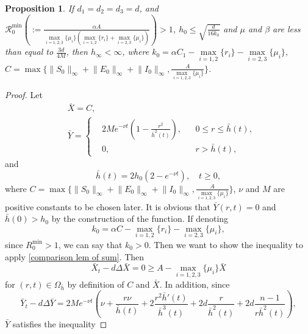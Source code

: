\documentclass[11pt]{amsart}
\numberwithin{equation}{section}
\theoremstyle{plain}
\newtheorem{proposition}[theorem]{Proposition}
\theoremstyle{definition}
\begin{document}
\begin{proposition}
	If $d_1=d_2=d_3=d$, and $\mathcal R_0^{\min}\left(:=\frac{\alpha A}{\max\limits_{i=1,2,3}\{\mu_i\}(\max\limits_{i=1,2}\{r_i\}+\max\limits_{i=2,3}\{\mu_i\})}\right)>1$, $h_0\leq \sqrt{\frac{d}{16k_0}}$ and $\mu$ and $\beta$ are less than equal to $\frac{3d}{4M}$, then $h_\infty < \infty$, where $k_0=\alpha C_1 -\max\limits_{i=1,2}\{r_i\}-\max\limits_{i=2,3}\{\mu_i\}$, $C=\max\{\lVert S_0 \rVert_\infty+\lVert E_0 \rVert_\infty+\lVert I_0 \rVert_\infty,\frac{A}{\max\limits_{i=1,2,3}\{\mu_i\}}\}$.
\end{proposition}
\begin{proof}
	Let
	\begin{equation*}
		\begin{aligned}
			&\bar{X}=C,\\
			&\bar{Y}=\left\{ \begin{aligned}
			&2Me^{-\nu t}(1-\frac{r^2}{\bar{h}^2(t)}), &&0\leq r \leq \bar h(t),\\
			&0, &&r>\bar h (t),
			\end{aligned} \right.
		\end{aligned}
	\end{equation*}
	and \begin{equation*}
		\bar h (t) =2h_0(2-e^{-\nu t}),\quad t\geq 0,
	\end{equation*}
	where $C=\max\{\lVert S_0 \rVert_\infty+\lVert E_0 \rVert_\infty+\lVert I_0 \rVert_\infty,\frac{A}{\max\limits_{i=1,2,3}\{\mu_i\}}\}$, $\nu$ and $M$ are positive constants to be chosen later. It is obvious that
	$\bar Y (r,t)=0$ and $\bar h(0)>h_0$
	by the construction of the function. If denoting
	\begin{equation*}
		k_0=\alpha C -\max\limits_{i=1,2}\{r_i\}-\max\limits_{i=2,3}\{\mu_i\},
	\end{equation*} since $R_0^{\min}>1$, we can say that $k_0>0$. Then we want to show the inequality to apply \cref{comparison lem of sum}. Then
	\begin{equation*}
			\bar X_t-d\Delta \bar X = 0 \geq A - \max_{i=1,2,3} \{ \mu _i\} \bar{X}
	\end{equation*}
	for $(r,t) \in \Omega_{\bar h}$ by definition of $C$ and $\bar X$. In addition, since
	\begin{equation*}
		\bar Y_t-d\Delta \bar Y = 2Me^{-\nu t}\left(\nu+\frac{r\nu}{\bar h(t)}+2\frac{r^2 \bar h'(t)}{\bar h ^3(t)}+2d\frac{r}{\bar h^2(t)}+2d\frac{n-1}{r\bar h^2(t)}\right),
	\end{equation*}
	$\bar Y$ satisfies the inequality

\end{proof}
\end{document}
